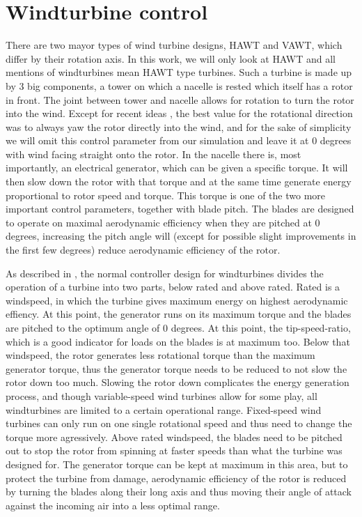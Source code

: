 \documentclass[hyperref,german,beleg]{cgvpub}
\begin{document}
\section{Windturbine control}
There are two mayor types of wind turbine designs, \ac{HAWT} and \ac{VAWT}, which differ by their rotation axis. In this work, we will only look at \ac{HAWT} and all mentions of windturbines mean \ac{HAWT} type turbines. Such a turbine is made up by 3 big components, a tower on which a nacelle is rested which itself has a rotor in front. 
The joint between tower and nacelle allows for rotation to turn the rotor into the wind. Except for recent ideas \cite{Howland_Lele_Dabiri_2019}, the best value for the rotational direction was to always yaw the rotor directly into the wind, and for the sake of simplicity we will omit this control parameter from our simulation and leave it at 0 degrees with wind facing straight onto the rotor.
In the nacelle there is, most importantly, an electrical generator, which can be given a specific torque. It will then slow down the rotor with that torque and at the same time generate energy proportional to rotor speed and torque. This torque is one of the two more important control parameters, together with blade pitch. The blades are designed to operate on maximal aerodynamic efficiency when they are pitched at 0 degrees, increasing the pitch angle will (except for possible slight improvements in the first few degrees) reduce aerodynamic efficiency of the rotor.

As described in \cite[sec 8.3]{Burton_Jenkins_Sharpe_Bossanyi_2011}, the normal controller design for windturbines divides the operation of a turbine into two parts, below rated and above rated. Rated is a windspeed, in which the turbine gives maximum energy on highest aerodynamic effiency. At this point, the generator runs on its maximum torque and the blades are pitched to the optimum angle of 0 degrees. At this point, the tip-speed-ratio, which is a good indicator for loads on the blades is at maximum too.
Below that windspeed, the rotor generates less rotational torque than the maximum generator torque, thus the generator torque needs to be reduced to not slow the rotor down too much. Slowing the rotor down complicates the energy generation process, and though variable-speed wind turbines allow for some play, all windturbines are limited to a certain operational range. Fixed-speed wind turbines can only run on one single rotational speed and thus need to change the torque more agressively.
Above rated windspeed, the blades need to be pitched out to stop the rotor from spinning at faster speeds than what the turbine was designed for. The generator torque can be kept at maximum in this area, but to protect the turbine from damage, aerodynamic efficiency of the rotor is reduced by turning the blades along their long axis and thus moving their angle of attack against the incoming air into a less optimal range.
\end{document}
